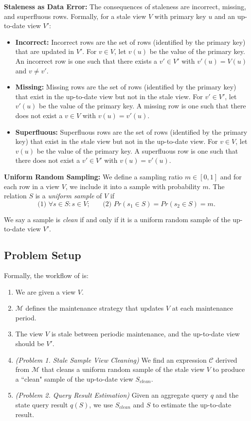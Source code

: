 \noindent \textbf{Staleness as Data Error:} The consequences of staleness are incorrect, missing, and superfluous rows. 
Formally, for a stale view $V$ with primary key $u$ and an up-to-date view $V'$:
\begin{itemize}[noitemsep] \sloppy
	\item \textbf{Incorrect: } Incorrect rows are the set of rows (identified by the primary key) that are updated in $V'$. For $v \in V$, let $v(u)$ be the value of the primary key. An incorrect row is one such that there exists a $v' \in V'$ with $v'(u) = V(u)$ and $v \ne v'$.
	\item \textbf{Missing: } Missing rows are the set of rows (identified by the primary key) that exist in the up-to-date view but not in the stale view. For $v' \in V'$, let $v'(u)$ be the value of the primary key. A missing row is one such that there does not exist a $v \in V$ with $v(u) = v'(u)$.
	\item \textbf{Superfluous: } Superfluous rows are the set of rows (identified by the primary key) that exist in the stale view but not in the up-to-date view. For $v \in V$, let $v(u)$ be the value of the primary key. A superfluous row is one such that there does not exist a $v' \in V'$ with $v(u) = v'(u)$.
\end{itemize}

\vspace{0.5em}

\noindent \textbf{Uniform Random Sampling:}
We define a sampling ratio $m\in [0,1]$ and for each row in a view $V$, we include it into a sample with probability $m$.
The relation $S$ is a \emph{uniform sample} of $V$ if
\[\text{(1) } \forall s \in S : s \in V\text{;~~~~~ (2) }Pr(s_1 \in S) =  Pr(s_2 \in S) = m.\]

\vspace{0.5em}

We say a sample is \emph{clean} if and only if it is a uniform random sample of the up-to-date view $V'$. 

\subsection{Problem Setup}
Formally, the workflow of \svc is:\vspace{-0.5em}
\begin{enumerate}[noitemsep]
\item We are given a view $V$.
\item $\mathcal{M}$ defines the maintenance strategy that updates $V$ at each maintenance period.
\item The view $V$ is stale between periodic maintenance, and the up-to-date view should be $V'$.
\item \emph{(Problem 1. Stale Sample View Cleaning)} We find an expression $\mathcal{C}$ derived from $\mathcal{M}$ 
that cleans a uniform random sample of the stale view $V$ to produce a ``clean" sample of the up-to-date
view $S_{clean}$.
\item \emph{(Problem 2. Query Result Estimation)} Given an aggregate query $q$ and the state query result $q(S)$, we use $S_{clean}$ and $S$ to estimate the up-to-date result.
\end{enumerate} 

